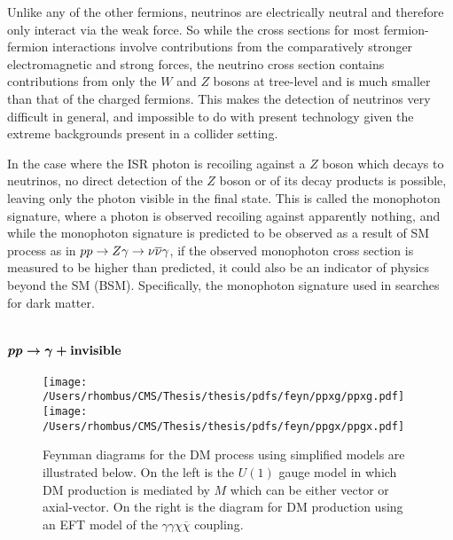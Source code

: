  Unlike any of the other fermions, 
  neutrinos are electrically neutral
  and therefore only interact via
  the weak force. 
 So while the cross sections for
  most fermion-fermion interactions involve
  contributions from the comparatively stronger
  electromagnetic and strong forces,
  the neutrino cross section contains
  contributions from only the $W$ and $Z$
  bosons at tree-level and is
  much smaller than that of the charged fermions.
 This makes the detection of neutrinos very difficult in general,
  and impossible to do with present technology
  given the extreme backgrounds present
  in a collider setting.
  
 In the case where the ISR photon is recoiling
  against a $Z$ boson which decays
  to neutrinos, 
  no direct detection of the $Z$ boson or of
  its decay products is possible,
  leaving only the photon visible in the final state.
 This is called the monophoton signature,
  where a photon is observed recoiling against
  apparently nothing, and while the
  monophoton signature is predicted to be
  observed as a result of SM process as in $pp\rightarrow Z\gamma\rightarrow\nu\overline{\nu}\gamma$,
  if the observed monophoton cross section is measured to be higher 
  than predicted, it could also be an indicator of physics beyond the SM (BSM).
 Specifically, the monophoton signature used in searches for dark matter.


 \section[Dark matter models of \pploneg]
 {$\boldsymbol{pp\rightarrow \gamma + \mathrm{invisible}}$}

\begin{figure}[!h]
 \center
 \caption[Feynman diagrams for dark matter  monophoton]{
  Feynman diagrams for the DM process
   \pploneg using simplified models
   are illustrated below.
  On the left is the $U(1)$ gauge
   model in which DM production
   is mediated by $M$ which can 
   be either vector or axial-vector.
  On the right is the diagram for 
   DM production using an 
   EFT model of the $\gamma\gamma\chi\overline{\chi}$
   coupling.
 } 
 \texttt{[image: /Users/rhombus/CMS/Thesis/thesis/pdfs/feyn/ppxg/ppxg.pdf]}
 \texttt{[image: /Users/rhombus/CMS/Thesis/thesis/pdfs/feyn/ppgx/ppgx.pdf]}
    \label{fig:ppxgfeyn}
\end{figure}

